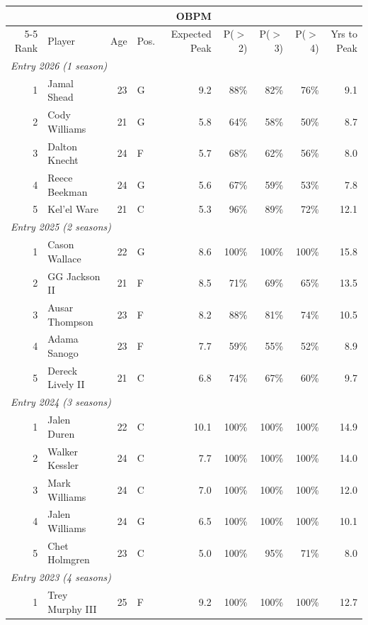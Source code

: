 \begin{table}[htbp]
  \centering\small
  \begin{tabular}{rlrlrrrrr}
    \toprule
     & & & & OBPM & & & & \\
    \cmidrule(lr){5-5}
    Rank & Player & Age & Pos. & Expected Peak & P($>$2) & P($>$3) & P($>$4) & Yrs to Peak \\
    \midrule
    \multicolumn{9}{l}{\textit{Entry 2026 (1 season)}} \\
    \midrule
    1 & Jamal Shead & 23 & G & 9.2 & 88\% & 82\% & 76\% & 9.1 \\
    2 & Cody Williams & 21 & G & 5.8 & 64\% & 58\% & 50\% & 8.7 \\
    3 & Dalton Knecht & 24 & F & 5.7 & 68\% & 62\% & 56\% & 8.0 \\
    4 & Reece Beekman & 24 & G & 5.6 & 67\% & 59\% & 53\% & 7.8 \\
    5 & Kel'el Ware & 21 & C & 5.3 & 96\% & 89\% & 72\% & 12.1 \\
    \midrule[0.4pt]
    \multicolumn{9}{l}{\textit{Entry 2025 (2 seasons)}} \\
    \midrule
    1 & Cason Wallace & 22 & G & 8.6 & 100\% & 100\% & 100\% & 15.8 \\
    2 & GG Jackson II & 21 & F & 8.5 & 71\% & 69\% & 65\% & 13.5 \\
    3 & Ausar Thompson & 23 & F & 8.2 & 88\% & 81\% & 74\% & 10.5 \\
    4 & Adama Sanogo & 23 & F & 7.7 & 59\% & 55\% & 52\% & 8.9 \\
    5 & Dereck Lively II & 21 & C & 6.8 & 74\% & 67\% & 60\% & 9.7 \\
    \midrule[0.4pt]
    \multicolumn{9}{l}{\textit{Entry 2024 (3 seasons)}} \\
    \midrule
    1 & Jalen Duren & 22 & C & 10.1 & 100\% & 100\% & 100\% & 14.9 \\
    2 & Walker Kessler & 24 & C & 7.7 & 100\% & 100\% & 100\% & 14.0 \\
    3 & Mark Williams & 24 & C & 7.0 & 100\% & 100\% & 100\% & 12.0 \\
    4 & Jalen Williams & 24 & G & 6.5 & 100\% & 100\% & 100\% & 10.1 \\
    5 & Chet Holmgren & 23 & C & 5.0 & 100\% & 95\% & 71\% & 8.0 \\
    \midrule[0.4pt]
    \multicolumn{9}{l}{\textit{Entry 2023 (4 seasons)}} \\
    \midrule
    1 & Trey Murphy III & 25 & F & 9.2 & 100\% & 100\% & 100\% & 12.7 \\

\end{tabular}
\end{table}
